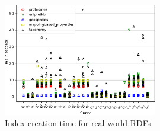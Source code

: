 \begin{figure}
    \centering
   \includegraphics[width=0.6\textwidth]{other_all.pdf}
   \caption{Index creation time for real-world RDFs}
   \label{fig:other_all_qs}
\end{figure}



